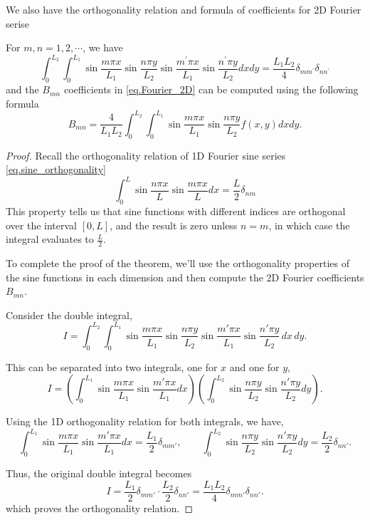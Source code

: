 We also have the orthogonality relation and formula of coefficients for 2D Fourier serise 
\begin{theorem} For $m, n=1,2, \cdots$, we have
    $$
    \int_0^{L_2} \int_0^{L_1} \sin \frac{m \pi x}{L_1} \sin \frac{n \pi y}{L_2} \sin \frac{m^{\prime} \pi x}{L_1} \sin \frac{n^{\prime} \pi y}{L_2} d x d y=\frac{L_1 L_2}{4} \delta_{m m^{\prime}} \delta_{n n^{\prime}}
    $$
and the $B_{mn}$ coefficients in \eqref{eq.Fourier_2D} can be computed using the following formula
\begin{equation}\label{eq.coef_formula_2D_Fourier}
    B_{mn} = \frac{4}{L_1L_2}\int_0^{L_2} \int_0^{L_1} \sin \frac{m \pi x}{L_1} \sin \frac{n \pi y}{L_2} f(x, y) d x d y.
\end{equation}
\end{theorem}
\begin{proof}
Recall the orthogonality relation of 1D Fourier sine series \eqref{eq.sine_orthogonality}
$$
\int_0^L \sin \frac{n \pi x}{L} \sin \frac{m \pi x}{L} d x=\frac{L}{2} \delta_{n m}
$$
This property tells us that sine functions with different indices are orthogonal over the interval $[0, L]$, and the result is zero unless $n = m$, in which case the integral evaluates to $\frac{L}{2}$.

To complete the proof of the theorem, we'll use the orthogonality properties of the sine functions in each dimension and then compute the 2D Fourier coefficients $B_{mn}$.

Consider the double integral,
\[
I = \int_0^{L_2} \int_0^{L_1} \sin \frac{m \pi x}{L_1} \sin \frac{n \pi y}{L_2} \sin \frac{m' \pi x}{L_1} \sin \frac{n' \pi y}{L_2} \, dx \, dy.
\]

This can be separated into two integrals, one for $x$ and one for $y$,
\[
I = \left( \int_0^{L_1} \sin \frac{m \pi x}{L_1} \sin \frac{m' \pi x}{L_1} dx \right) \left( \int_0^{L_2} \sin \frac{n \pi y}{L_2} \sin \frac{n' \pi y}{L_2} dy \right).
\]

Using the 1D orthogonality relation for both integrals, we have,
\[
\int_0^{L_1} \sin \frac{m \pi x}{L_1} \sin \frac{m' \pi x}{L_1} dx = \frac{L_1}{2} \delta_{m m'},\qquad \int_0^{L_2} \sin \frac{n \pi y}{L_2} \sin \frac{n' \pi y}{L_2} dy = \frac{L_2}{2} \delta_{n n'}.
\]

Thus, the original double integral becomes
\[
I = \frac{L_1}{2} \delta_{m m'} \cdot \frac{L_2}{2} \delta_{n n'} = \frac{L_1 L_2}{4} \delta_{m m'} \delta_{n n'}.
\]
which proves the orthogonality relation.


\end{proof}
